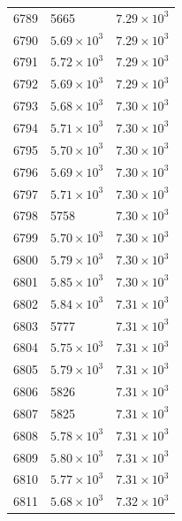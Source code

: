 \begin{table}[H]
\begin{tabular}{lll}
6789 & 5665 & $\displaystyle 7.29 \times 10^{3}$ \\
6790 & $\displaystyle 5.69 \times 10^{3}$ & $\displaystyle 7.29 \times 10^{3}$ \\
6791 & $\displaystyle 5.72 \times 10^{3}$ & $\displaystyle 7.29 \times 10^{3}$ \\
6792 & $\displaystyle 5.69 \times 10^{3}$ & $\displaystyle 7.29 \times 10^{3}$ \\
6793 & $\displaystyle 5.68 \times 10^{3}$ & $\displaystyle 7.30 \times 10^{3}$ \\
6794 & $\displaystyle 5.71 \times 10^{3}$ & $\displaystyle 7.30 \times 10^{3}$ \\
6795 & $\displaystyle 5.70 \times 10^{3}$ & $\displaystyle 7.30 \times 10^{3}$ \\
6796 & $\displaystyle 5.69 \times 10^{3}$ & $\displaystyle 7.30 \times 10^{3}$ \\
6797 & $\displaystyle 5.71 \times 10^{3}$ & $\displaystyle 7.30 \times 10^{3}$ \\
6798 & 5758 & $\displaystyle 7.30 \times 10^{3}$ \\
6799 & $\displaystyle 5.70 \times 10^{3}$ & $\displaystyle 7.30 \times 10^{3}$ \\
6800 & $\displaystyle 5.79 \times 10^{3}$ & $\displaystyle 7.30 \times 10^{3}$ \\
6801 & $\displaystyle 5.85 \times 10^{3}$ & $\displaystyle 7.30 \times 10^{3}$ \\
6802 & $\displaystyle 5.84 \times 10^{3}$ & $\displaystyle 7.31 \times 10^{3}$ \\
6803 & 5777 & $\displaystyle 7.31 \times 10^{3}$ \\
6804 & $\displaystyle 5.75 \times 10^{3}$ & $\displaystyle 7.31 \times 10^{3}$ \\
6805 & $\displaystyle 5.79 \times 10^{3}$ & $\displaystyle 7.31 \times 10^{3}$ \\
6806 & 5826 & $\displaystyle 7.31 \times 10^{3}$ \\
6807 & 5825 & $\displaystyle 7.31 \times 10^{3}$ \\
6808 & $\displaystyle 5.78 \times 10^{3}$ & $\displaystyle 7.31 \times 10^{3}$ \\
6809 & $\displaystyle 5.80 \times 10^{3}$ & $\displaystyle 7.31 \times 10^{3}$ \\
6810 & $\displaystyle 5.77 \times 10^{3}$ & $\displaystyle 7.31 \times 10^{3}$ \\
6811 & $\displaystyle 5.68 \times 10^{3}$ & $\displaystyle 7.32 \times 10^{3}$ \\

\end{tabular}
\end{table}

